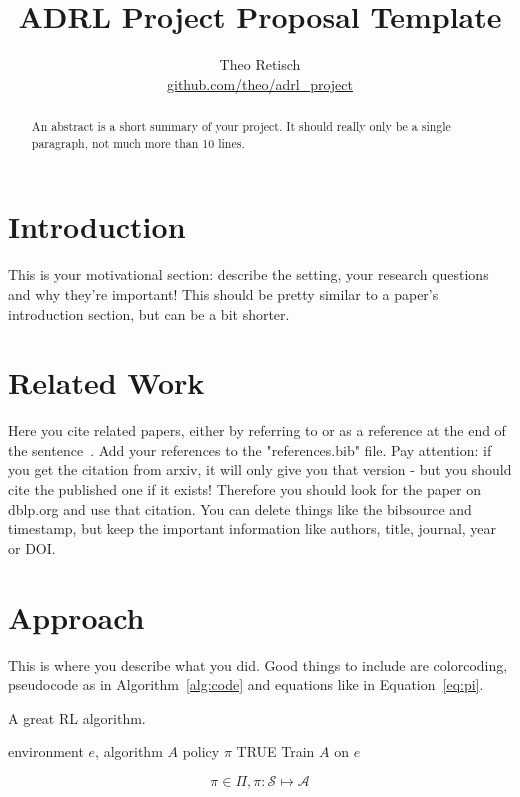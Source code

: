 \documentclass{article}
\title{ADRL Project Proposal Template}
\author{Theo Retisch \\ \url{github.com/theo/adrl_project}}
\begin{document}
\maketitle
\begin{abstract}
    An abstract is a short summary of your project. It should really only be a single paragraph, not much more than 10 lines.
\end{abstract}
\section{Introduction}
This is your motivational section: describe the setting, your research questions and why they're important! This should be pretty similar to a paper's introduction section, but can be a bit shorter.

\section{Related Work}
Here you cite related papers, either by referring to \cite{parkerholder-jair22} or as a reference at the end of the sentence~\citep{parkerholder-jair22}. 
Add your references to the "references.bib" file. 
Pay attention: if you get the citation from arxiv, it will only give you that version - but you should cite the published one if it exists! 
Therefore you should look for the paper on dblp.org and use that citation. 
You can delete things like the bibsource and timestamp, but keep the important information like authors, title, journal, year or DOI.

\section{Approach}
This is where you describe what you did. Good things to include are {\color{orange} colorcoding}, pseudocode as in Algorithm~\ref{alg:code} and equations like in Equation~\ref{eq:pi}.

\begin{algorithm}[H]
    \caption{A great RL algorithm.}
    \label{alg:code}
    \begin{algorithmic}
        \Require environment $e$, algorithm $A$
        \Return policy $\pi$
        \While TRUE
            \State Train $A$ on $e$
        \EndWhile
    \end{algorithmic}
\end{algorithm}

\begin{equation}
    \label{eq:pi}
    \pi \in \Pi, \pi: \mathcal{S} \mapsto \mathcal{A}
\end{equation}
\end{document}
